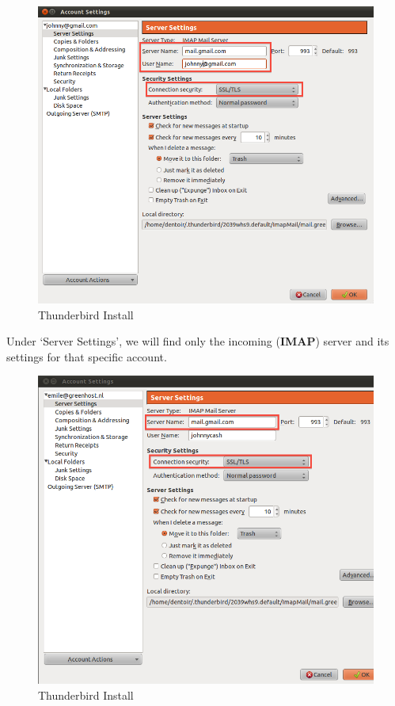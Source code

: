 \begin{figure}[htbp]
\centering
\includegraphics{thunderbird_conf_3.png}
\caption{Thunderbird Install}
\end{figure}

Under `Server Settings', we will find only the incoming (\textbf{IMAP})
server and its settings for that specific account.

\begin{figure}[htbp]
\centering
\includegraphics{thunderbird_conf_4.png}
\caption{Thunderbird Install}
\end{figure}

